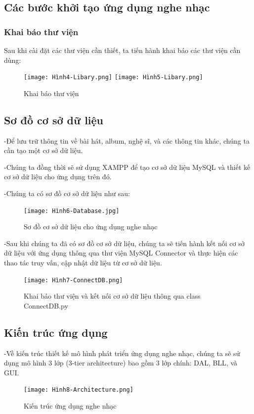 \documentclass[a4paper]{article}
\begin{document}
\subsection{Các bước khởi tạo ứng dụng nghe nhạc}
\subsubsection{Khai báo thư viện}
\begin{flushleft}
	Sau khi cài đặt các thư viện cần thiết, ta tiến hành khai báo các thư viện cần dùng:
	\begin{figure}[h]
		\centering
		\texttt{[image: Hình4-Libary.png]}
		\texttt{[image: Hình5-Libary.png]}
		\caption{Khai báo thư viện}
	\end{figure}
\end{flushleft}
\newpage
\subsection{Sơ đồ cơ sở dữ liệu}
\begin{flushleft}
	-Để lưu trữ thông tin về bài hát, album, nghệ sĩ, và các thông tin khác, chúng ta cần tạo một cơ sở dữ liệu.

	-Chúng ta đồng thời sẽ sử dụng XAMPP để tạo cơ sở dữ liệu MySQL và thiết kế cơ sở dữ liệu cho ứng dụng trên đó.

	-Chúng ta có sơ đồ cơ sở dữ liệu như sau:
	\begin{figure}[h]
		\begin{center}
			\texttt{[image: Hình6-Database.jpg]}
			\caption{Sơ đồ cơ sở dữ liệu cho ứng dụng nghe nhạc}
		\end{center}
	\end{figure}

	-Sau khi chúng ta đã có sơ đồ cơ sở dữ liệu, chúng ta sẽ tiến hành kết nối cơ sở dữ liệu với ứng dụng thông qua thư viện MySQL Connector
	và thực hiện các thao tác truy vấn, cập nhật dữ liệu từ cơ sở dữ liệu.

	\begin{figure}[h]
		\centering
		\texttt{[image: Hình7-ConnectDB.png]}
		\caption{Khai báo thư viện và kết nối cơ sở dữ liệu thông qua class ConnectDB.py}
	\end{figure}
\end{flushleft}
\clearpage
\newpage
\subsection{Kiến trúc ứng dụng}
\begin{flushleft}
	-Về kiến trúc thiết kế mô hình phát triển ứng dụng nghe nhạc, chúng ta sẽ sử dụng mô hình 3 lớp (3-tier architecture)
	bao gồm 3 lớp chính: DAL, BLL, và GUI.
	\begin{figure}[h]
		\centering
		\texttt{[image: Hình8-Architecture.png]}
		\caption{Kiến trúc ứng dụng nghe nhạc}
	\end{figure}
\end{flushleft}
\end{document}
